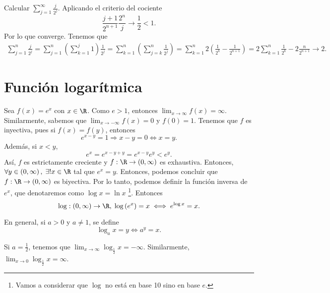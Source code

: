 \begin{eg}
\normalfont Calcular $\displaystyle \sum^{\infty}_{j = 1}\frac{j}{2^{j}} $. Aplicando el criterio del cociente
\[\frac{j+1}{2^{n+1}}\frac{2^{n}}{j} \to \frac{1}{2} < 1 .\]
Por lo que converge. Tenemos que
\[
\begin{split}
\sum^{n}_{j=1}\frac{j}{2^{j}} = \sum^{n}_{j=1}\left(\sum^{j}_{k=1}1\right)\frac{1}{2^{j}} = \sum^{n}_{k=1}\left(\sum^{n}_{j=k}\frac{1}{2^{j}}\right) = \sum^{n}_{k=1}2\left(\frac{1}{2^{k}}-\frac{1}{2^{n+1}}\right)  = 2\sum^{n}_{k=1}\frac{1}{2^{k}}-2\frac{n}{2^{n+1}} \to 2.
\end{split}
\]

\end{eg}


\section{Función logarítmica}
Sea $\displaystyle f\left(x\right) = e^{x} $ con $\displaystyle x \in \R $. Como $\displaystyle e > 1 $, entonces $\displaystyle \lim_{x \to \infty}f\left(x\right)=\infty $. Similarmente, sabemos que $\displaystyle \lim_{x \to -\infty}f\left(x\right) = 0 $ y $\displaystyle f\left(0\right) = 1 $. Tenemos que $\displaystyle f $ es inyectiva, pues si $\displaystyle f\left(x\right) = f\left(y\right) $, entonces
\[e^{x-y} = 1 \Rightarrow x - y = 0 \iff x = y .\]
Además, si $\displaystyle x < y $, 
\[e^{x} = e^{x-y+y} = e^{x-y}e^{y} < e^{y} .\]
Así, $\displaystyle f $ es estrictamente creciente y $\displaystyle f: \R \to \left(0, \infty\right) $ es exhaustiva. Entonces, $\displaystyle \forall y \in \left(0, \infty\right), \; \exists!x \in \R $ tal que $\displaystyle e^{x} = y $. Entonces, podemos concluir que $\displaystyle f: \R \to \left(0, \infty\right) $ es biyectiva. Por lo tanto, podemos definir la función inversa de $\displaystyle e^{x} $, que denotaremos como $\displaystyle \log x = \ln x $  \footnote{Vamos a considerar que $\displaystyle \log  $ no está en base 10 sino en base $\displaystyle e $.}. Entonces
\[\log:\left(0,\infty\right) \to \R, \; \log\left(e^{x}\right) = x \iff e^{\log x } = x .\]

\begin{observation}
\normalfont En general, si $\displaystyle a > 0 $ y $\displaystyle a\neq 1 $, se define 
\[\log_{a}x = y \iff a^{y} = x  .\]
\end{observation}

\begin{eg}
\normalfont Si $\displaystyle a = \frac{1}{2} $, tenemos que $\displaystyle \lim_{x \to \infty}\log_{\frac{1}{2}}x = -\infty $. Similarmente, $\displaystyle \lim_{x \to 0}\log_{\frac{1}{2}}x= \infty $.
\end{eg}

